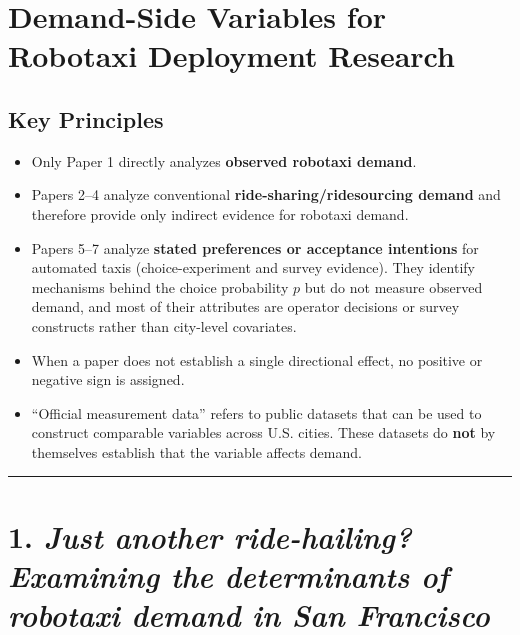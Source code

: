 \documentclass[10pt,a4paper]{article}
\providecommand{\tightlist}{\setlength{\itemsep}{0pt}\setlength{\parskip}{0pt}}
\begin{document}
\hypertarget{demand-side-variables-for-robotaxi-deployment-research}{%
\section{Demand-Side Variables for Robotaxi Deployment Research}\label{demand-side-variables-for-robotaxi-deployment-research}}

\hypertarget{key-principles}{%
\subsection{Key Principles}\label{key-principles}}

\begin{itemize}
\tightlist
\item
  Only Paper 1 directly analyzes \textbf{observed robotaxi demand}.
\item
  Papers 2--4 analyze conventional \textbf{ride-sharing/ridesourcing demand} and therefore provide only indirect evidence for robotaxi demand.
\item 
  Papers 5--7 analyze \textbf{stated preferences or acceptance intentions} for automated taxis (choice-experiment and survey evidence). They identify mechanisms behind the choice probability $p$ but do not measure observed demand, and most of their attributes are operator decisions or survey constructs rather than city-level covariates.
\item
  When a paper does not establish a single directional effect, no positive or negative sign is assigned.
\item
  ``Official measurement data'' refers to public datasets that can be used to construct comparable variables across U.S. cities. These datasets do \textbf{not} by themselves establish that the variable affects demand.
\end{itemize}

\begin{center}\rule{0.5\linewidth}{0.5pt}\end{center}

\hypertarget{just-another-ride-hailing-examining-the-determinants-of-robotaxi-demand-in-san-francisco}{%
\section{\texorpdfstring{1. \emph{Just another ride-hailing? Examining the determinants of robotaxi demand in San Francisco}}{1. Just another ride-hailing? Examining the determinants of robotaxi demand in San Francisco}}\label{just-another-ride-hailing-examining-the-determinants-of-robotaxi-demand-in-san-francisco}}
\end{document}
